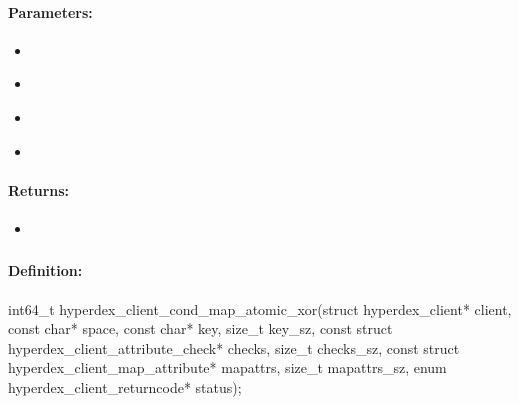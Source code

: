 \paragraph{Parameters:}
\begin{itemize}[noitemsep]
\item {}\\

\item {}\\

\item {}\\

\item {}\\

\end{itemize}

\paragraph{Returns:}
\begin{itemize}[noitemsep]
\item {}\\

\end{itemize}

\pagebreak
\subsubsection{}
\label{api:c:cond_map_atomic_xor}


\paragraph{Definition:}
\begin{ccode}
int64_t hyperdex_client_cond_map_atomic_xor(struct hyperdex_client* client,
        const char* space,
        const char* key, size_t key_sz,
        const struct hyperdex_client_attribute_check* checks, size_t checks_sz,
        const struct hyperdex_client_map_attribute* mapattrs, size_t mapattrs_sz,
        enum hyperdex_client_returncode* status);
\end{ccode}

